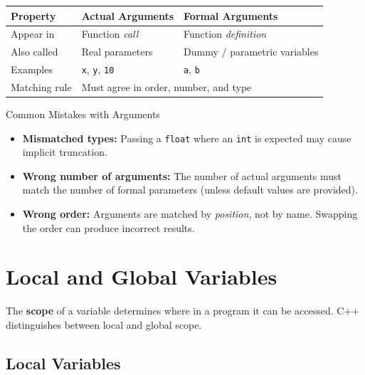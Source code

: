 \begin{center}
\renewcommand{\arraystretch}{1.4}
\begin{tabular}{@{}lll@{}}
\toprule
\textbf{Property} & \textbf{Actual Arguments}
    & \textbf{Formal Arguments} \\
\midrule
Appear in          & Function \emph{call}
    & Function \emph{definition} \\
Also called        & Real parameters
    & Dummy / parametric variables \\
Examples           & \texttt{x}, \texttt{y}, \texttt{10}
    & \texttt{a}, \texttt{b} \\
Matching rule      & \multicolumn{2}{l}{%
    Must agree in order, number, and type} \\
\bottomrule
\end{tabular}
\end{center}

\begin{warningbox}{Common Mistakes with Arguments}
\begin{itemize}
    \item \textbf{Mismatched types:} Passing a \texttt{float} where an
          \texttt{int} is expected may cause implicit truncation.
    \item \textbf{Wrong number of arguments:} The number of actual arguments
          must match the number of formal parameters (unless default values
          are provided).
    \item \textbf{Wrong order:} Arguments are matched by \emph{position}, not
          by name. Swapping the order can produce incorrect results.
\end{itemize}
\end{warningbox}

\section{Local and Global Variables}
\label{sec:local-global-variables}

The \textbf{scope} of a variable determines where in a program it can be
accessed. C++ distinguishes between local and global scope.

\subsection{Local Variables}
\label{subsec:local-variables}

